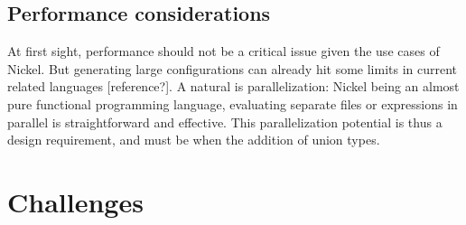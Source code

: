 \documentclass[sigplan,10pt,review,anonymous]{acmart}
\newcommand{\unsure}[2][1=]{}
\newcommand{\info}[2][1=]{}
\begin{document}
\unsure{Something that we must mention somewhere: if we want to check
  that something is a list of As lazily (to avoid making functions
  like hd be O(n), for instance), then we have a lot of the problems of
  higher-order contracts anyway.}

\subsection{Performance considerations}
\info{This a draft}

At first sight, performance should not be a critical issue given the use cases
of Nickel. But generating large configurations can already hit some limits in
current related languages [reference?]. A natural is parallelization:
Nickel being an almost pure functional programming language, evaluating separate
files or expressions in parallel is straightforward and effective. This
parallelization potential is thus a design requirement, and must be when the
addition of union types.

\section{Challenges}

\end{document}
